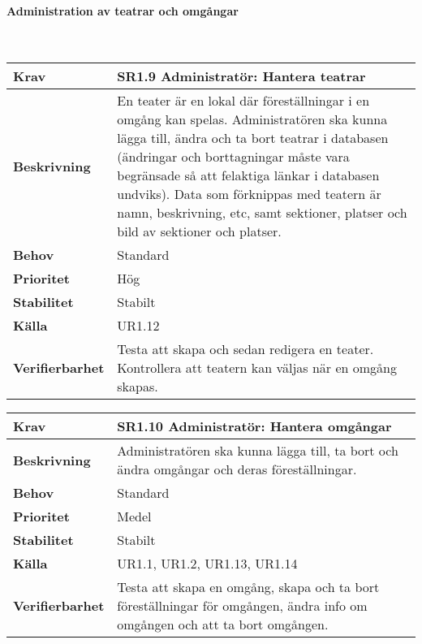\documentclass[a4paper, twoside, 11pt, titlepage]{article}
\begin{document}
			\paragraph{Administration av teatrar och omgångar}\

			\begin {table} [ht] \begin{tabular} { p{2.6cm} p{12.5cm} }
				\hline
				\sffamily\textbf{Krav} & \sffamily\textbf{SR1.9 Administratör: Hantera teatrar } \\
				\hline
				\sffamily\textbf{Beskrivning} & En teater är en lokal där föreställningar i en omgång kan spelas. Administratören ska kunna lägga till, ändra och ta bort teatrar i databasen (ändringar och borttagningar måste vara begränsade så att felaktiga länkar i databasen undviks). Data som förknippas med teatern är namn, beskrivning, etc, samt sektioner, platser och bild av sektioner och platser.  \\
				\hline
				\sffamily\textbf{Behov} & Standard  \\
				\hline
				\sffamily\textbf{Prioritet} & Hög  \\
				\hline
				\sffamily\textbf{Stabilitet} & Stabilt  \\
				\hline
				\sffamily\textbf{Källa} & UR1.12  \\
				\hline
				\sffamily\textbf{Verifierbarhet} & Testa att skapa och sedan redigera en teater. Kontrollera att teatern kan väljas när en omgång skapas.  \\
				\hline
			\end{tabular} \end{table} \FloatBarrier
			\vspace{6mm}

			\begin {table} [ht] \begin{tabular} { p{2.6cm} p{12.5cm} }
				\hline
				\sffamily\textbf{Krav} & \sffamily\textbf{SR1.10 Administratör: Hantera omgångar } \\
				\hline
				\sffamily\textbf{Beskrivning} & Administratören ska kunna lägga till, ta bort och ändra omgångar och deras föreställningar.  \\
				\hline
				\sffamily\textbf{Behov} & Standard  \\
				\hline
				\sffamily\textbf{Prioritet} & Medel  \\
				\hline
				\sffamily\textbf{Stabilitet} & Stabilt  \\
				\hline
				\sffamily\textbf{Källa} & UR1.1, UR1.2, UR1.13, UR1.14  \\
				\hline
				\sffamily\textbf{Verifierbarhet} & Testa att skapa en omgång, skapa och ta bort föreställningar för omgången, ändra info om omgången och att ta bort omgången.  \\
				\hline
			\end{tabular} \end{table} \FloatBarrier
\end{document}
